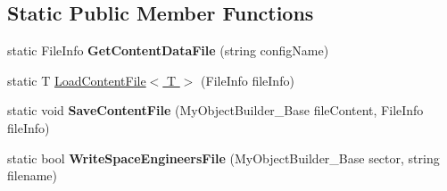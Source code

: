 \subsection*{Static Public Member Functions}
\begin{DoxyCompactItemize}
\item 
\hypertarget{class_s_e_mod_a_p_i_internal_1_1_a_p_i_1_1_entity_1_1_base_object_manager_ab14fb4be22664f32ce064c1897ac2dd5}{}static File\+Info {\bfseries Get\+Content\+Data\+File} (string config\+Name)\label{class_s_e_mod_a_p_i_internal_1_1_a_p_i_1_1_entity_1_1_base_object_manager_ab14fb4be22664f32ce064c1897ac2dd5}

\item 
static T \hyperlink{class_s_e_mod_a_p_i_internal_1_1_a_p_i_1_1_entity_1_1_base_object_manager_a47df2ff20866aaa1e9af6f61a1d47f00}{Load\+Content\+File$<$ T $>$} (File\+Info file\+Info)
\item 
\hypertarget{class_s_e_mod_a_p_i_internal_1_1_a_p_i_1_1_entity_1_1_base_object_manager_a36933d340a8b441fddd9d16a65377bce}{}static void {\bfseries Save\+Content\+File} (My\+Object\+Builder\+\_\+\+Base file\+Content, File\+Info file\+Info)\label{class_s_e_mod_a_p_i_internal_1_1_a_p_i_1_1_entity_1_1_base_object_manager_a36933d340a8b441fddd9d16a65377bce}

\item 
\hypertarget{class_s_e_mod_a_p_i_internal_1_1_a_p_i_1_1_entity_1_1_base_object_manager_a32459dd97830e4e9b7bd0ae9e5815dc4}{}static bool {\bfseries Write\+Space\+Engineers\+File} (My\+Object\+Builder\+\_\+\+Base sector, string filename)\label{class_s_e_mod_a_p_i_internal_1_1_a_p_i_1_1_entity_1_1_base_object_manager_a32459dd97830e4e9b7bd0ae9e5815dc4}

\end{DoxyCompactItemize}
